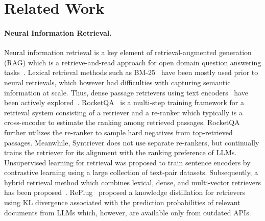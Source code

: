 \section{Related Work}
\paragraph{Neural Information Retrieval.}
Neural information retrieval is a key element of retrieval-augmented generation (RAG) \cite{lewis2020retrieval} which is a retrieve-and-read approach for open domain question answering tasks~\cite{chen2017reading}. 
Lexical retrieval methods such as BM-25~\cite{robertson2009probabilistic} have been mostly used prior to neural retrievals, which however had difficulties with capturing semantic information at scale. Thus, dense passage retrievers using text encoders~\cite{devlin2018bert} have been actively explored~\cite{karpukhin2020dense, gao2022unsupervised, xiong2021approximate}. 
RocketQA~\cite{qu2021rocketqa} is a multi-step training framework for a retrieval system consisting of a retriever and a re-ranker which typically is a cross-encoder to estimate the ranking among retrieved passages. RocketQA further utilizes the re-ranker to sample hard negatives from top-retrieved passages. Meanwhile, Syntriever does not use separate re-rankers, but continually trains the retriever for its alignment with the ranking preference of LLMs.
Unsupervised learning for retrieval \cite{izacard2021unsupervised, wang2022text} was proposed to train sentence encoders by contrastive learning using a large collection of text-pair datasets. Subsequently, a hybrid retrieval method which combines lexical, dense, and multi-vector retrievers has been proposed~\cite{chen2024bge}. RePlug~\cite{shi2024replug} proposed a knowledge distillation for retrievers using KL divergence associated with the prediction probabilities of relevant documents from LLMs which, however, are available only from outdated APIs. 

